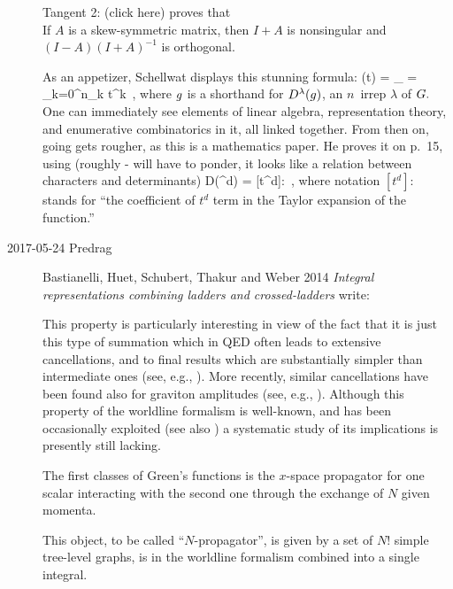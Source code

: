 \begin{description}
Tangent 2:  {(click here)}
proves that%
\\
If $A$ is a skew-symmetric matrix, then $I+A$ is nonsingular and
$(I-A)(I+A)^{-1}$ is orthogonal.

As an appetizer, Schellwat displays this stunning formula:
\beq
\Phi(t) =
 \sum_{\LieEl\in \Group} 
        = \sum_{k=0}^\infty n_k t^k
\,,
where $g$ is a shorthand for $D^\lambda(g)$, an $n$\dmn\ irrep $\lambda$
of $G.$
One can immediately see elements of linear algebra, representation theory, and
enumerative combinatorics in it, all linked together. From then on, going gets
rougher, as this is a mathematics paper. He proves it on p.~15, using (roughly -
will have to ponder, it looks like a relation between characters and determinants)
\beq
\tr D(\LieEl^d) =
[t^d]:
\,,
where notation $[t^d]:$ stands for ``the coefficient of $t^d$ term in the
Taylor expansion of the function.''


\item[2017-05-24 Predrag]
Bastianelli, Huet, Schubert, Thakur and Weber 2014
{\em Integral representations combining ladders and crossed-ladders}
write:

This property is particularly interesting in view of the fact that it is
just this type of summation which in QED often leads to extensive
cancellations, and to final results which are substantially simpler than
intermediate ones (see, e.g., ). More recently, similar
cancellations have been found also for graviton amplitudes (see, e.g.,
).
Although this property of the worldline formalism is well-known, and has
been occasionally exploited (see also
) a systematic study of its implications is
presently still lacking.

The first classes of Green's functions %
is the
$x$-space propagator for one scalar interacting with the second one
through the exchange of $N$ given momenta.

This object, to be called ``$N$-propagator'', is given by a set of $N!$
simple tree-level graphs, is in the worldline formalism combined into a
single integral.


\end{description}
